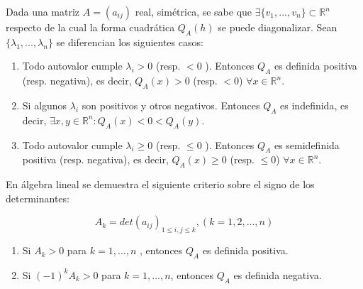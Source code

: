 \begin{prop}
Dada una matriz $A=(a_{ij})$ real, simétrica, se sabe que $\exists \{v_1,...,v_n\}\subset\mathbb{R}^n$ respecto de la cual la forma cuadrática $Q_A(h)$ se puede diagonalizar. Sean $\{\lambda_1,...,\lambda_n\}$ se diferencian los siguientes casos:

\begin{enumerate}[label=(\roman*)]
    \item Todo autovalor cumple $\lambda_i > 0$ (resp. $< 0$ ). Entonces $Q_A$ es definida positiva (resp. negativa), es decir, $Q_A(x) > 0$ (resp. $< 0$) $\forall x\in\mathbb{R}^n$.
    \item Si algunos $\lambda_i$ son positivos y otros negativos. Entonces $Q_A$ es indefinida, es decir, $\exists x,y\in\mathbb{R}^n: Q_A(x) < 0 < Q_A(y)$.
    \item Todo autovalor cumple $\lambda_i \geq 0$ (resp. $\leq 0$ ). Entonces $Q_A$ es semidefinida positiva (resp. negativa), es decir, $Q_A(x) \geq 0$ (resp. $\leq 0$) $\forall x\in\mathbb{R}^n$.
\end{enumerate}

En álgebra lineal se demuestra el siguiente criterio sobre el signo de los determinantes:

\[ A_k = det(a_{ij})_{1\leq i,j\leq k} , (k=1,2,...,n) \]

\begin{enumerate}[label=(\roman*)]
    \item Si $A_k > 0$ para $k = 1,...,n$ , entonces $Q_A$ es definida positiva.
    \item Si $(-1)^k A_k > 0$ para $k = 1,...,n$, entonces $Q_A$ es definida negativa.
\end{enumerate}
\end{prop}

